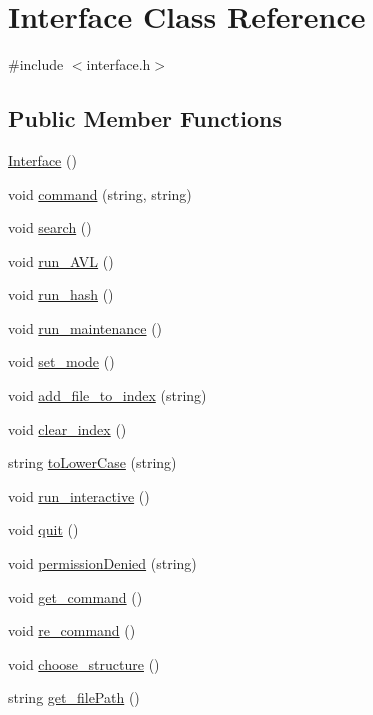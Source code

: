 \hypertarget{class_interface}{}\section{Interface Class Reference}
\label{class_interface}


{\ttfamily \#include $<$interface.\+h$>$}

\subsection*{Public Member Functions}
\begin{DoxyCompactItemize}
\item 
\hyperlink{class_interface_a4406d74c75bdfe150bf72be1f1cda8b1}{Interface} ()
\item 
void \hyperlink{class_interface_aa1d2750e9c624107fcde02b8d69eb69a}{command} (string, string)
\item 
void \hyperlink{class_interface_a043b8fe5fb3a2ca4603c7592d8c7d0e2}{search} ()
\item 
void \hyperlink{class_interface_a57532e2ede5d40e3595427f4129517b9}{run\+\_\+\+A\+V\+L} ()
\item 
void \hyperlink{class_interface_a53dd2dc9fcb214f40b4031f7854cffe3}{run\+\_\+hash} ()
\item 
void \hyperlink{class_interface_a7384173d1857ae65156b58913ec31d1c}{run\+\_\+maintenance} ()
\item 
void \hyperlink{class_interface_a2c7d25d68192d1dd451be039922b2b46}{set\+\_\+mode} ()
\item 
void \hyperlink{class_interface_abf4ac54601aad5f8cb929a7649a8b935}{add\+\_\+file\+\_\+to\+\_\+index} (string)
\item 
void \hyperlink{class_interface_a19dbc4e711b5341ca2f81de689c6d5ee}{clear\+\_\+index} ()
\item 
string \hyperlink{class_interface_ab1c8e554ab1de3e19c4bcd09682b701a}{to\+Lower\+Case} (string)
\item 
void \hyperlink{class_interface_a48828fb2f7d1ce9cc3fe8f8bcf1a87b7}{run\+\_\+interactive} ()
\item 
void \hyperlink{class_interface_a7ba995236d529ab0aee1229eb94b793d}{quit} ()
\item 
void \hyperlink{class_interface_a3c7464353b37ffe8962db67c421fe30a}{permission\+Denied} (string)
\item 
void \hyperlink{class_interface_ac7d71f89f09c5367e9d998291526acfc}{get\+\_\+command} ()
\item 
void \hyperlink{class_interface_ae2e80336e351baf5c266bd85bb4f9281}{re\+\_\+command} ()
\item 
void \hyperlink{class_interface_a182ad83393eb72b7db55f0e65d4a0ad6}{choose\+\_\+structure} ()
\item 
string \hyperlink{class_interface_a2bee39caa585218f975c1310093dd124}{get\+\_\+file\+Path} ()
\end{DoxyCompactItemize}
